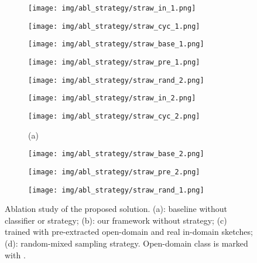 \documentclass[10pt,twocolumn,letterpaper]{article}
\begin{document}
\begin{figure}[tbp]
\begin{center}
  \begin{subfigure}[b]{\strwidth\linewidth}
  \texttt{[image: img/abl\_strategy/straw\_in\_1.png]}
  \end{subfigure}
  \begin{subfigure}[b]{\strwidth\linewidth}
  \texttt{[image: img/abl\_strategy/straw\_cyc\_1.png]}
  \end{subfigure}
  \begin{subfigure}[b]{\strwidth\linewidth}
  \texttt{[image: img/abl\_strategy/straw\_base\_1.png]}
  \end{subfigure}
  \begin{subfigure}[b]{\strwidth\linewidth}
  \texttt{[image: img/abl\_strategy/straw\_pre\_1.png]}
  \end{subfigure}
\begin{subfigure}[b]{\strwidth\linewidth}
  \texttt{[image: img/abl\_strategy/straw\_rand\_2.png]}
  \end{subfigure}
  
  \begin{subfigure}[b]{\strwidth\linewidth}
  \texttt{[image: img/abl\_strategy/straw\_in\_2.png]}
  \end{subfigure}
   \begin{subfigure}[b]{\strwidth\linewidth}
  \texttt{[image: img/abl\_strategy/straw\_cyc\_2.png]}
  \caption{(a)}
  \end{subfigure} 
  \begin{subfigure}[b]{\strwidth\linewidth}
  \texttt{[image: img/abl\_strategy/straw\_base\_2.png]}
  \end{subfigure}
   \begin{subfigure}[b]{\strwidth\linewidth}
  \texttt{[image: img/abl\_strategy/straw\_pre\_2.png]}
  \end{subfigure}
\begin{subfigure}[b]{\strwidth\linewidth}
  \texttt{[image: img/abl\_strategy/straw\_rand\_1.png]}
  \end{subfigure}
\end{center}
\caption{Ablation study of the proposed solution. (a): baseline without classifier or strategy; (b): our framework without strategy; (c) trained with pre-extracted open-domain and real in-domain sketches; (d): random-mixed sampling strategy. Open-domain class is marked with \textcolor{blue}{}.}
 \label{fig:abl_strategy}
\end{figure}
\end{document}
